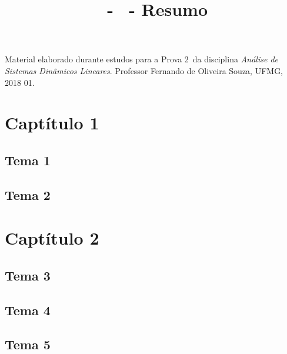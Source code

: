 \documentclass{article}
\title{\ufmgdisciplina\,  - \ufmgtema \, - Resumo}
\author{\ufmgestudante}
\date{\ufmgsemestre}
\newcommand{\ufmgdisciplina}{Análise de Sistemas Dinâmicos Lineares}
\newcommand{\ufmgtema}{Prova 2}
\newcommand{\ufmgsemestre}{2018 01}
\newcommand{\ufmgprofessor}{Fernando de Oliveira Souza}
\begin{document}
\maketitle

Material elaborado durante estudos para a \ufmgtema \,  da disciplina \emph{\ufmgdisciplina}. Professor \ufmgprofessor, UFMG, \ufmgsemestre.

\section{Captítulo 1}

\subsection{Tema 1}

\subsection{Tema 2}

\section{Captítulo 2}

\subsection{Tema 3}

\subsection{Tema 4}

\subsection{Tema 5}
\end{document}
